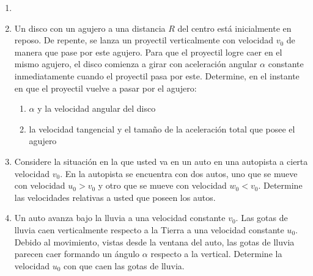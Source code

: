 \documentclass[letterpaper,11pt]{article}
\begin{document}
\vspace{-1.0cm}
\begin{enumerate}\setlength{\itemsep}{0.4cm}


\item[]

\item Un disco con un agujero a una distancia $R$ del centro está inicialmente en reposo. De repente, se lanza un proyectil verticalmente con velocidad $v_0$ de manera que pase por este agujero. Para que el proyectil logre caer en el mismo agujero, el disco comienza a girar con aceleración angular $\alpha$ constante inmediatamente cuando el proyectil pasa por este. Determine, en el instante en que el proyectil vuelve a pasar por el agujero:
\begin{enumerate}
    \item $\alpha$ y la velocidad angular del disco
    
    \item la velocidad tangencial y el tamaño de la aceleración total que posee el agujero
\end{enumerate}

\begin{figure}[H]
    \centering
    
\end{figure}

\item Considere la situación en la que usted va en un auto en una autopista a cierta velocidad $v_0$. En la autopista se encuentra con dos autos, uno que se mueve con velocidad $u_0 > v_0$ y otro que se mueve con velocidad $w_0 < v_0$. Determine las velocidades relativas a usted que poseen los autos. 

\item Un auto avanza bajo la lluvia a una velocidad constante $v_0$. Las gotas de lluvia caen verticalmente respecto a la Tierra a una velocidad constante $u_0$. Debido al movimiento, vistas desde la ventana del auto, las gotas de lluvia parecen caer formando un ángulo $\alpha$ respecto a la vertical. Determine la velocidad $u_0$ con que caen las gotas de lluvia.

\end{enumerate}
\end{document}
